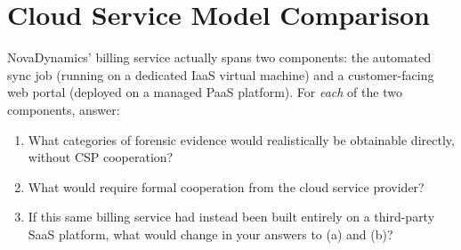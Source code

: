 \section{Cloud Service Model Comparison}

\begin{questionbox}
NovaDynamics' billing service actually spans two components: the automated sync job (running on
a dedicated IaaS virtual machine) and a customer-facing web portal (deployed on a managed PaaS
platform). For \emph{each} of the two components, answer:
\begin{enumerate}[label=(\alph*)]
	\item What categories of forensic evidence would realistically be obtainable directly,
	      without CSP cooperation?
	\item What would require formal cooperation from the cloud service provider?
	\item If this same billing service had instead been built entirely on a third-party SaaS
	      platform, what would change in your answers to (a) and (b)?
\end{enumerate}
\end{questionbox}

\begin{answerbox}
\vspace{5cm}
\end{answerbox}
